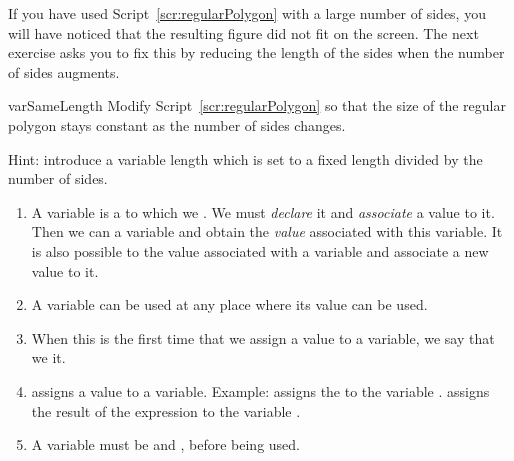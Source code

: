 If you have used Script~\ref{scr:regularPolygon} with a large number of sides, you will have noticed that the resulting figure did not fit on the screen.  The next exercise asks you to fix this by reducing the
length of the sides when the number of sides augments.

\begin{exofig}{varSameLength} \label{exo:fixedSizePolygon}
Modify Script~\ref{scr:regularPolygon} so that the size of the
regular polygon stays constant as the number of sides changes.

Hint: introduce a variable length which is set to a fixed length
divided by the number of sides.
\end{exofig}


\summa

\begin{enumerate}
\item A variable is a  to which we . We must \emph{declare} it and  \emph{associate} a value to it. Then we can  a variable and obtain the \emph{value} associated with this variable. It is also possible to  the value associated with a variable and associate a new value to it. 
 
\item A variable can be used at any place where its value can be used.  

\item When this is the first time that we assign a value to a variable, we say that we  it. 

\item \ct{:=} assigns a value to a variable. Example:  assigns the   to the variable .   assigns the result of the expression   \ie {} to the variable .

\item A variable must be  and , before being used.

\end{enumerate}


